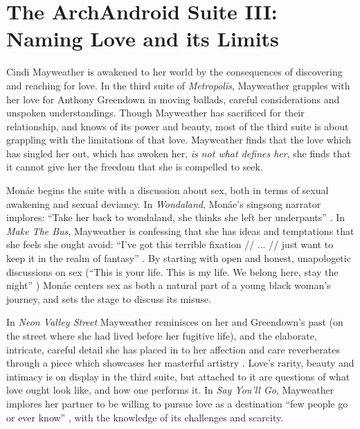 \documentclass[a4paper, 11pt]{article} %
\begin{document}

\section*{The ArchAndroid Suite III: Naming Love and its Limits}

Cindi Mayweather is awakened to her world by the consequences of discovering and reaching for love.
In the third suite of \emph{Metropolis}, Mayweather grapples with her love for Anthony Greendown in moving ballads, careful considerations and unspoken understandings.
Though Mayweather has sacrificed for their relationship, and knows of its power and beauty, most of the third suite is about grappling with the limitations of that love.
Mayweather finds that the love which has singled her out, which has awoken her, \emph{is not what defines her}, she finds that it cannot give her the freedom that she is compelled to seek.

Mon\'ae begins the suite with a discussion about sex, both in terms of sexual awakening and sexual deviancy.
In \emph{Wondaland}, Mon\'ae's singsong narrator implores: ``Take her back to wondaland, she thinks she left her underpants'' .
In \emph{Make The Bus}, Mayweather is confessing that she has ideas and temptations that she feels she ought avoid:
``I've got this terrible fixation // ... // just want to keep it in the realm of fantasy'' .
By starting with open and honest, unapologetic discussions on sex (``This is your life. This is my life. We belong here, stay the night'' ) 
Mon\'ae centers sex as both a natural part of a young black woman's journey, and sets the stage to discuss its misuse.

In \emph{Neon Valley Street} Mayweather reminisces on her and Greendown's past (on the street where she had lived before her fugitive life), and the elaborate, intricate, careful detail she has placed in to her affection and care reverberates through a piece which showcases her masterful artistry .
Love's rarity, beauty and intimacy is on display in the third suite, but attached to it are questions of what love ought look like, and how one performs it.
In \emph{Say You'll Go}, Mayweather implores her partner to be willing to pursue love as a destination ``few people go or ever know'' , with the knowledge of its challenges and scarcity.
\end{document}
